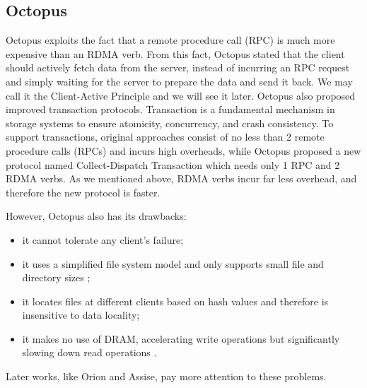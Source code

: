 \begin{survey}
\section{Octopus}
Octopus exploits the fact that a remote procedure call (RPC) is much more expensive than an RDMA verb. From this fact, Octopus stated that the client should actively fetch data from the server, instead of incurring an RPC request and simply waiting for the server to prepare the data and send it back. We may call it the Client-Active Principle and we will see it later. Octopus also proposed improved transaction protocols. Transaction is a fundamental mechanism in storage systems to ensure atomicity, concurrency, and crash consistency. To support transactions, original approaches consist of no less than 2 remote procedure calls (RPCs) and incurs high overheads, while Octopus proposed a new protocol named Collect-Dispatch Transaction which needs only 1 RPC and 2 RDMA verbs. As we mentioned above, RDMA verbs incur far less overhead, and therefore the new protocol is faster.

However, Octopus also has its drawbacks:

\begin{itemize}
    \item it cannot tolerate any client’s failure; 
    \item it uses a simplified file system model and only supports small file and directory sizes \cite{orion2019};
    \item it locates files at different clients based on hash values and therefore is insensitive to data locality;
    \item it makes no use of DRAM, accelerating write operations but significantly slowing down read operations \cite{assise2019}.
\end{itemize}

Later works, like Orion and Assise, pay more attention to these problems.


\end{survey}
